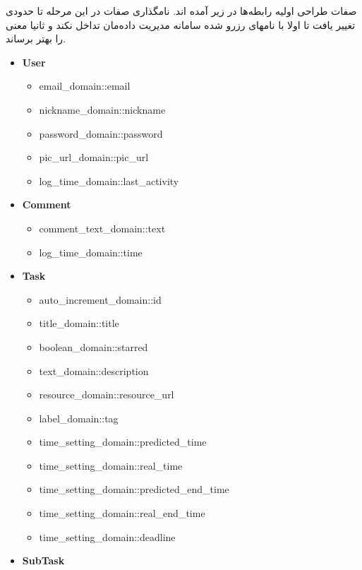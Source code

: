 \documentclass{article}
\begin{document}
صفات طراحی اولیه رابطه‌ها در زیر آمده اند. نامگذاری صفات در این مرحله تا حدودی تغییر یافت تا اولا با نامهای رزرو شده سامانه مدیریت داده‌مان تداخل نکند و ثانیا معنی را بهتر برساند. 
\latin
\begin{itemize}
\item \textbf{User}

	\begin{itemize}
	
	\item email\_domain::email
	
	\item nickname\_domain::nickname
	
	\item password\_domain::password
	
	\item pic\_url\_domain::pic\_url
	
	\item log\_time\_domain::last\_activity
	\end{itemize}
	
\item \textbf{Comment}

	\begin{itemize}
	\item comment\_text\_domain::text
	\item log\_time\_domain::time
	\end{itemize}
	
\item \textbf{Task}

	\begin{itemize}
	\item auto\_increment\_domain::id
	\item title\_domain::title
	\item boolean\_domain::starred
	\item text\_domain::description
	\item resource\_domain::resource\_url
	\item label\_domain::tag
	\item time\_setting\_domain::predicted\_time
	\item time\_setting\_domain::real\_time
	\item time\_setting\_domain::predicted\_end\_time
	\item time\_setting\_domain::real\_end\_time
	\item time\_setting\_domain::deadline
	\end{itemize}
	
\item \textbf{SubTask}


\end{itemize}
\end{document}
